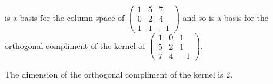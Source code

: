\documentclass[oneside,12pt]{amsart}
\begin{document}
is a basis for the column space of $
\begin{pmatrix}
1 & 5 & 7 \\
0 & 2 & 4 \\
1 & 1 & -1
\end{pmatrix}
$ and so is a basis for the orthogonal compliment of the kernel of $
\begin{pmatrix}
1 & 0 & 1 \\
5 & 2 & 1 \\
7 & 4 & -1
\end{pmatrix}
$.

The dimension of the orthogonal compliment of the kernel is 2.
\end{document}

